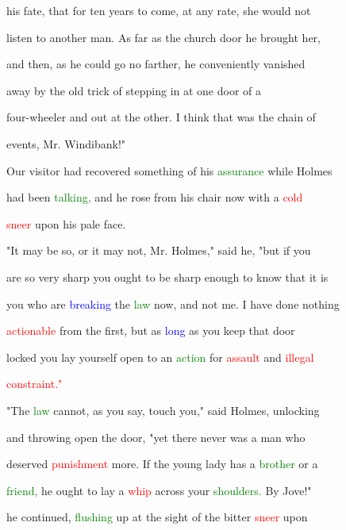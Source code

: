  his \textcolor{BurntOrange}{fate,} that for ten years to come, at any rate, she would not

 listen to another man. As far as the \textcolor{BurntOrange}{church} door he brought her,

 and then, as he could go no farther, he conveniently \textcolor{BurntOrange}{vanished}

 away by the old \textcolor{BurntOrange}{trick} of stepping in at one door of a

 four-wheeler and out at the other. I think that was the chain of

 events, Mr. Windibank!"



 Our \textcolor{BurntOrange}{visitor} had recovered something of his \textcolor{green}{assurance} while Holmes

 had been \textcolor{green}{talking,} and he rose from his chair now with a \textcolor{red}{cold}

 \textcolor{red}{sneer} upon his pale face.



 "It may be so, or it may not, Mr. Holmes," said he, "but if you

 are so very sharp you ought to be sharp enough to know that it is

 you who are \textcolor{blue}{breaking} the \textcolor{green}{law} now, and not me. I have done nothing

 \textcolor{red}{actionable} from the first, but as \textcolor{blue}{long} as you keep that door

 locked you lay yourself open to an \textcolor{green}{action} for \textcolor{red}{assault} and \textcolor{red}{illegal}

 \textcolor{red}{constraint."}



 "The \textcolor{green}{law} cannot, as you say, touch you," said Holmes, unlocking

 and throwing open the door, "yet there never was a man who

 \textcolor{BurntOrange}{deserved} \textcolor{red}{punishment} more. If the \textcolor{BurntOrange}{young} lady has a \textcolor{green}{brother} or a

 \textcolor{green}{friend,} he ought to lay a \textcolor{red}{whip} across your \textcolor{green}{shoulders.} By Jove!"

 he continued, \textcolor{green}{flushing} up at the sight of the bitter \textcolor{red}{sneer} upon

